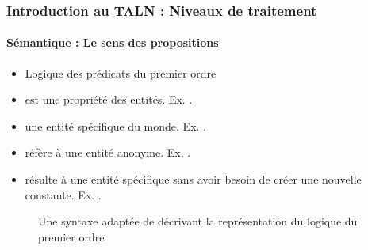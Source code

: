 \documentclass[xcolor=table]{beamer}
\begin{document}
\begin{frame}
\frametitle{Introduction au TALN : Niveaux de traitement}
\framesubtitle{Sémantique : Le sens des propositions}

\begin{minipage}{0.5\textwidth}
\begin{itemize}
	\item Logique des prédicats du premier ordre
	\item {} est une propriété des entités. Ex. .	
	\item {} une entité spécifique du monde. Ex. .
	\item {} réfère à une entité anonyme. Ex. .
	\item {} résulte à une entité spécifique sans avoir besoin de créer une nouvelle constante. Ex. .
\end{itemize}
\end{minipage}
\begin{minipage}{0.48\textwidth}
	\begin{figure}
		\caption{Une syntaxe adaptée de \cite{2002-russell-norvig} décrivant la représentation du logique du premier ordre \cite{2019-jurafsky-martin}}
	\end{figure}
\end{minipage}

\end{frame}
\end{document}
